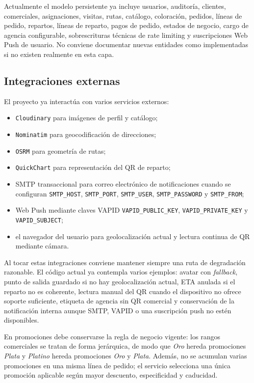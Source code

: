 Actualmente el modelo persistente ya incluye usuarios, auditoría, clientes, comerciales, asignaciones, visitas, rutas, catálogo, coloración, pedidos, líneas de pedido, repartos, líneas de reparto, pagos de pedido, estados de negocio, cargo de agencia configurable, sobrescrituras técnicas de rate limiting y suscripciones Web Push de usuario. No conviene documentar nuevas entidades como implementadas si no existen realmente en esta capa.

\subsection{Integraciones externas}

El proyecto ya interactúa con varios servicios externos:

\begin{itemize}
    \item \texttt{Cloudinary} para imágenes de perfil y catálogo;
    \item \texttt{Nominatim} para geocodificación de direcciones;
    \item \texttt{OSRM} para geometría de rutas;
    \item \texttt{QuickChart} para representación del QR de reparto;
    \item SMTP transaccional para correo electrónico de notificaciones cuando se configuran \texttt{SMTP\_HOST}, \texttt{SMTP\_PORT}, \texttt{SMTP\_USER}, \texttt{SMTP\_PASSWORD} y \texttt{SMTP\_FROM};
    \item Web Push mediante claves VAPID \texttt{VAPID\_PUBLIC\_KEY}, \texttt{VAPID\_PRIVATE\_KEY} y \texttt{VAPID\_SUBJECT};
    \item el navegador del usuario para geolocalización actual y lectura continua de QR mediante cámara.
\end{itemize}

Al tocar estas integraciones conviene mantener siempre una ruta de degradación razonable. El código actual ya contempla varios ejemplos: avatar con \textit{fallback}, punto de salida guardado si no hay geolocalización actual, ETA anulada si el reparto no es coherente, lectura manual del QR cuando el dispositivo no ofrece soporte suficiente, etiqueta de agencia sin QR comercial y conservación de la notificación interna aunque SMTP, VAPID o una suscripción push no estén disponibles.

En promociones debe conservarse la regla de negocio vigente: los rangos comerciales se tratan de forma jerárquica, de modo que \textit{Oro} hereda promociones \textit{Plata} y \textit{Platino} hereda promociones \textit{Oro} y \textit{Plata}. Además, no se acumulan varias promociones en una misma línea de pedido; el servicio selecciona una única promoción aplicable según mayor descuento, especificidad y caducidad.


